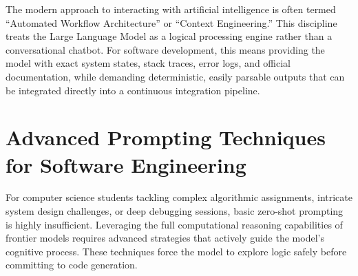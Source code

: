 \documentclass[12pt]{article}
\begin{document}
The modern approach to interacting with artificial intelligence is often termed
``Automated Workflow Architecture'' or ``Context Engineering.'' This discipline treats the Large Language Model as a logical
processing engine rather than a conversational chatbot. For software development, this means providing the
model with exact system states, stack traces, error logs, and official documentation, while demanding
deterministic, easily parsable outputs that can be integrated directly into a continuous integration
pipeline.

\section{Advanced Prompting Techniques for Software Engineering}
For computer science students tackling
complex algorithmic assignments, intricate system design challenges, or deep debugging sessions, basic
zero-shot prompting is highly insufficient. Leveraging the full computational reasoning capabilities of
frontier models requires advanced strategies that actively guide the model's cognitive process. These
techniques force the model to explore logic safely before committing to code
generation.
\end{document}
